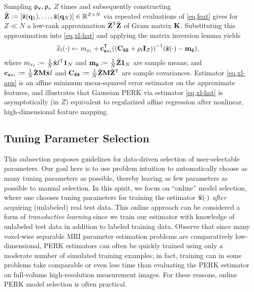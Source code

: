 Sampling $\mathsf{p}_{\mathbf{v}},\mathsf{p}_{s}$ $Z$ times
and subsequently constructing 
$\bmZt := 
	\brac{\bmztZa{\bmq_1},\dots,\bmztZa{\bmq_N}} \in \reals{Z \times N}$
via repeated evaluations of \eqref{eq,feat}
gives for $Z \ll N$
a low-rank approximation $\tilde{\mathbf{Z}}^{\mathsf{T}}\tilde{\mathbf{Z}}$ 
of Gram matrix $\mathbf{K}$.
Substituting this approximation into \eqref{eq,xl-hat}
and applying the matrix inversion lemma \cite{woodbury:50:imm} 
yields
\begin{align}
	\est{x}_l\paren{\cdot} \gets \mxl + 
		\cztxl\tpose\inv{\paren{\Cztzt + \rho_l\eye{Z}}} \paren{\bmztZa{\cdot}-\bmmzt},
	\label{eq,xl-apx}
\end{align}
where 
$m_{x_l} := \frac{1}{N}\tilde{\mathbf{x}}{l}^{\mathsf{T}}\boldsymbol{1}_{N}$ 
and 
$\mathbf{m}_{\tilde{\mathbf{z}}} := \frac{1}{N}\tilde{\mathbf{Z}}\boldsymbol{1}_{N}$ 
are sample means; 
and
$\mathbf{c}_{\mathbf{z} x_l} := \frac{1}{N}\tilde{\mathbf{Z}}\mathbf{M}\tilde{\mathbf{x}}{l}$
and 
$\mathbf{C_{\tilde{\mathbf{z}}\tilde{\mathbf{z}}}} := \frac{1}{N}\tilde{\mathbf{Z}}\mathbf{M}\tilde{\mathbf{Z}}^{\mathsf{T}}$ 
are sample covariances.
Estimator \eqref{eq,xl-apx} 
is an affine minimum mean-squared error estimator
on the approximate features,
and illustrates
that Gaussian PERK 
via estimator \eqref{eq,xl-hat}
is asymptotically (in $Z$) equivalent
to regularized affine regression
after nonlinear, high-dimensional feature mapping.

\subsection{Tuning Parameter Selection}
\label{ss,perk,pract,mod}

This subsection proposes guidelines
for data-driven selection
of user-selectable parameters.
Our goal here is
to use problem intuition
to automatically choose 
as many tuning parameters as possible,
thereby leaving as few parameters as possible
to manual selection.
In this spirit,
we focus on ``online'' model selection,
where one chooses tuning parameters
for training the estimator $\esta{\bmx}{\cdot}$
\emph{after} acquiring (unlabeled) real test data.
This online approach 
can be considered a form 
of \emph{transductive learning} \cite[Ch.~8]{vapnik:98:slt}
since we train our estimator
with knowledge of unlabeled test data
in addition to labeled training data.
Observe that since
many voxel-wise separable MRI parameter estimation problems
are comparatively low-dimensional,
PERK estimators can often be quickly trained
using only a moderate number
of simulated training examples;
in fact,
training can in some problems take
comparable or even less time
than evaluating the PERK estimator
on full-volume high-resolution measurement images.
For these reasons,
online PERK model selection is often practical.

